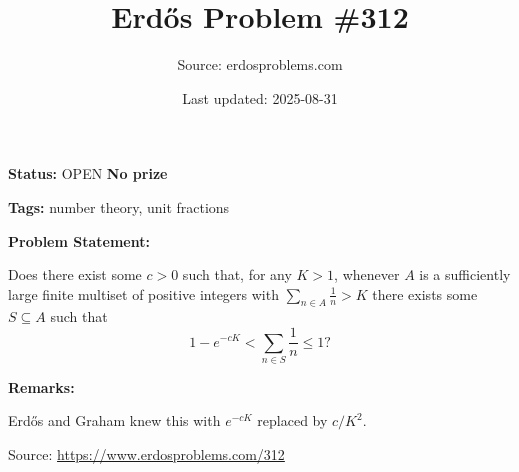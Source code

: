 \documentclass{article}
\title{Erd\H{o}s Problem \#312}
\date{Last updated: 2025-08-31}
\author{Source: erdosproblems.com}
\begin{document}
\maketitle

\noindent\textbf{Status:} OPEN \quad \textbf{No prize}

\noindent\textbf{Tags:} number theory, unit fractions

\medskip
\noindent\textbf{Problem Statement:}

Does there exist some $c>0$ such that, for any $K>1$, whenever $A$ is a sufficiently large finite multiset of positive integers with $\sum_{n\in A}\frac{1}{n}>K$ there exists some $S\subseteq A$ such that\[1-e^{-cK} < \sum_{n\in S}\frac{1}{n}\leq 1?\]

\bigskip
\noindent\textbf{Remarks:}

Erd\H{o}s and Graham knew this with $e^{-cK}$ replaced by $c/K^2$.

\bigskip
\noindent\small{Source: \url{https://www.erdosproblems.com/312}}
\end{document}
